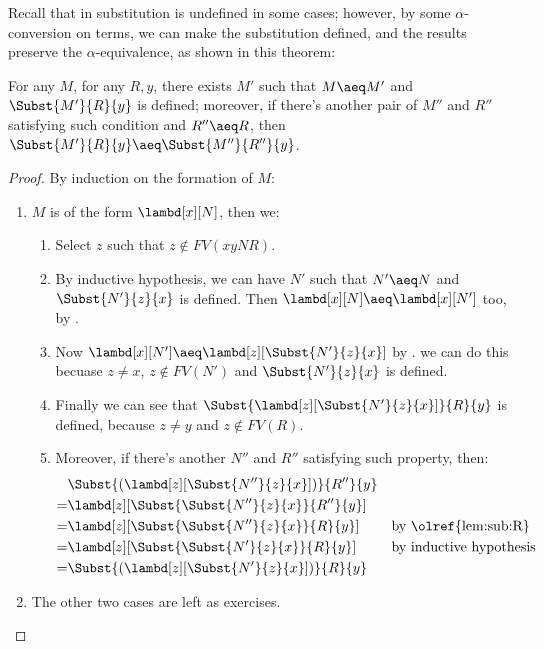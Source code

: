 \documentclass[../../../include/open-logic-section]{subfiles}
\begin{document}
Recall that in  substitution is
undefined in some cases; however, by some
$\alpha$-conversion on terms, we can make the substitution defined,
and the results preserve the $\alpha$-equivalence, as shown in this theorem:
\begin{thm}
  For any $M$, for any $R, y$, there exists $M'$
  such that $M \aeq M'$ and $\Subst{M'}{R}{y}$ is defined; moreover, if there's another pair of
  $M''$ and $R''$ satisfying such condition and $R'' \aeq R$, then $\Subst{M'}{R}{y} \aeq \Subst{M''}{R''}{y}$.
\end{thm}
\begin{proof}
  By induction on the formation of $M$:
  \begin{enumerate}
  \item $M$ is of the form $\lambd[x][N]$, then we:
    \begin{enumerate}
    \item Select $z$ such that $z \notin FV(xyNR)$.
    \item By inductive hypothesis, we can have $N'$ such that $N' \aeq N$
      and $\Subst{N'}{z}{x}$ is defined. Then $\lambd[x][N] \aeq
      \lambd[x][N']$ too, by .
    \item Now $\lambd[x][N'] \aeq \lambd[z][\Subst{N'}{z}{x}]$ by .
      we can do this becuase $z \ne x$, $z \notin FV(N')$ and
      $\Subst{N'}{z}{x}$ is defined.
    \item Finally we can see that
      $\Subst{\lambd[z][\Subst{N'}{z}{x}]}{R}{y}$ is defined,
      because $z \neq y$ and $z \notin FV(R)$.
    \item Moreover, if there's another $N''$ and $R''$ satisfying such
      property, then:
      \begin{align*}
        &\Subst{(\lambd[z][\Subst{N''}{z}{x}])}{R''}{y}\\
        =&\lambd[z][\Subst{\Subst{N''}{z}{x}}{R''}{y}] \\
        =&\lambd[z][\Subst{\Subst{N''}{z}{x}}{R}{y}]
         && \text{by \olref{lem:sub:R}}\\
        =&\lambd[z][\Subst{\Subst{N'}{z}{x}}{R}{y}]
         && \text{by inductive hypothesis}\\
        =&\Subst{(\lambd[z][\Subst{N'}{z}{x}])}{R}{y}
      \end{align*}
    \end{enumerate}
  \item The other two cases are left as
    exercises. 
  \end{enumerate}
\end{proof}
\end{document}
